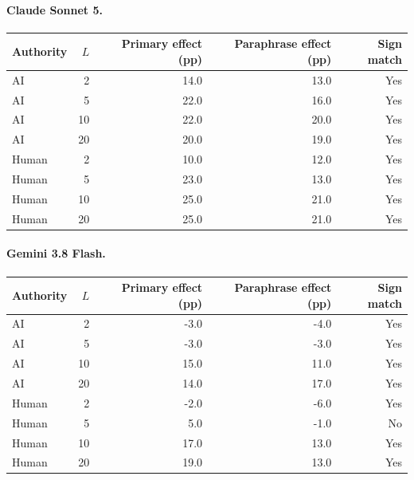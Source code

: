 \paragraph{Claude Sonnet 5.}
\begin{center}
\small
\begin{tabular}{lrrrr}
\toprule
Authority & $L$ & Primary effect (pp) & Paraphrase effect (pp) & Sign match \\
\midrule
AI & 2 & 14.0 & 13.0 & Yes \\
AI & 5 & 22.0 & 16.0 & Yes \\
AI & 10 & 22.0 & 20.0 & Yes \\
AI & 20 & 20.0 & 19.0 & Yes \\
Human & 2 & 10.0 & 12.0 & Yes \\
Human & 5 & 23.0 & 13.0 & Yes \\
Human & 10 & 25.0 & 21.0 & Yes \\
Human & 20 & 25.0 & 21.0 & Yes \\
\bottomrule
\end{tabular}
\end{center}

\paragraph{Gemini 3.8 Flash.}
\begin{center}
\small
\begin{tabular}{lrrrr}
\toprule
Authority & $L$ & Primary effect (pp) & Paraphrase effect (pp) & Sign match \\
\midrule
AI & 2 & -3.0 & -4.0 & Yes \\
AI & 5 & -3.0 & -3.0 & Yes \\
AI & 10 & 15.0 & 11.0 & Yes \\
AI & 20 & 14.0 & 17.0 & Yes \\
Human & 2 & -2.0 & -6.0 & Yes \\
Human & 5 & 5.0 & -1.0 & No \\
Human & 10 & 17.0 & 13.0 & Yes \\
Human & 20 & 19.0 & 13.0 & Yes \\
\bottomrule
\end{tabular}
\end{center}

